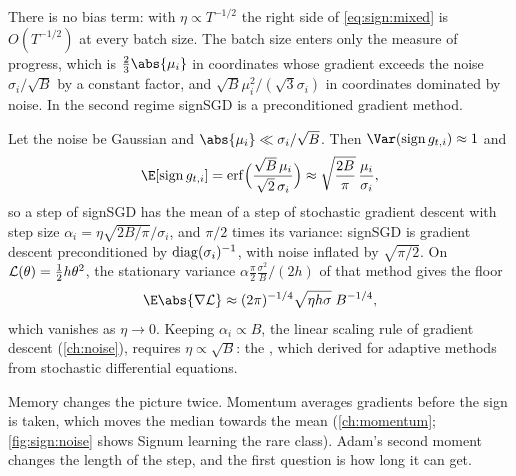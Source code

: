 \begin{refsection}
There is no bias term: with $\eta\propto T^{-1/2}$ the right side of \eqref{eq:sign:mixed} is $O(T^{-1/2})$ at every batch size. The batch size enters only the measure of progress, which is $\frac23\abs{\mu_i}$ in coordinates whose gradient exceeds the noise $\sigma_i/\sqrt B$ by a constant factor, and $\sqrt B\mu_i^2/(\sqrt3\sigma_i)$ in coordinates dominated by noise. In the second regime signSGD is a preconditioned gradient method.

\begin{heuristic}
Let the noise be Gaussian and $\abs{\mu_i}\ll\sigma_i/\sqrt B$. Then $\Var(\sign g_{t,i})\approx1$ and
\[
  \E[\sign g_{t,i}]=\erf\Bigl(\frac{\sqrt B\,\mu_i}{\sqrt2\,\sigma_i}\Bigr)\approx\sqrt{\frac{2B}\pi}\,\frac{\mu_i}{\sigma_i},
\]
so a step of signSGD has the mean of a step of stochastic gradient descent with step size $\alpha_i=\eta\sqrt{2B/\pi}/\sigma_i$, and $\pi/2$ times its variance: signSGD is gradient descent preconditioned by $\operatorname{diag}(\sigma_i)^{-1}$, with noise inflated by $\sqrt{\pi/2}$. On $\mathcal{L}(\theta)=\frac12h\theta^2$, the stationary variance $\alpha\frac\pi2\frac{\sigma^2}{B}/(2h)$ of that method gives the floor
\begin{equation}\label{eq:sign:gaussfloor}
  \E\abs{\nabla\Loss}\approx(2\pi)^{-1/4}\sqrt{\eta h\sigma}\;B^{-1/4},
\end{equation}
which vanishes as $\eta\to0$. Keeping $\alpha_i\propto B$, the linear scaling rule of gradient descent (\cref{ch:noise}), requires $\eta\propto\sqrt B$: the , which \textcite{MalladiEtAl2022} derived for adaptive methods from stochastic differential equations.
\end{heuristic}

Memory changes the picture twice. Momentum averages gradients before the sign is taken, which moves the median towards the mean (\cref{ch:momentum}; \cref{fig:sign:noise} shows Signum learning the rare class). Adam's second moment changes the length of the step, and the first question is how long it can get.


\end{refsection}
